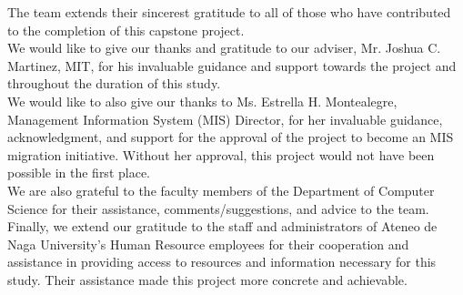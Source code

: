 \begin{acknowledgements}

The team extends their sincerest gratitude to all of those who have contributed to the completion of this capstone project.
\\

We would like to give our thanks and gratitude to our adviser, Mr. Joshua C. Martinez, MIT, for his invaluable guidance and support towards the project and throughout the duration of this study. 
\\

We would like to also give our thanks to Ms. Estrella H. Montealegre, Management Information System (MIS) Director, for her invaluable guidance, acknowledgment, and support for the approval of the project to become an MIS migration initiative. Without her approval, this project would not have been possible in the first place. 
\\

We are also grateful to the faculty members of the Department of Computer Science for their assistance, comments/suggestions, and advice to the team.
\\

Finally, we extend our gratitude to the staff and administrators of Ateneo de Naga University's Human Resource employees for their cooperation and assistance in providing access to resources and information necessary for this study. Their assistance made this project more concrete and achievable.
\\

\end{acknowledgements}
